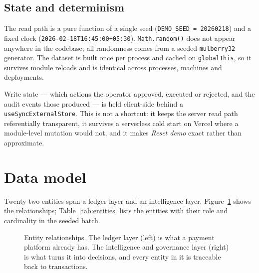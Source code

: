 \documentclass[10pt,twocolumn,a4paper]{article}
\newcommand{\code}[1]{\texttt{\small #1}}
\begin{document}
\subsection{State and determinism}

The read path is a pure function of a single seed (\code{DEMO\_SEED =
20260218}) and a fixed clock (\code{2026-02-18T16:45:00+05:30}).
\code{Math.random()} does not appear anywhere in the codebase; all randomness
comes from a seeded \code{mulberry32} generator. The dataset is built once per
process and cached on \code{globalThis}, so it survives module reloads and is
identical across processes, machines and deployments.

Write state --- which actions the operator approved, executed or rejected, and
the audit events those produced --- is held client-side behind a
\code{useSyncExternalStore}. This is not a shortcut: it keeps the server read
path referentially transparent, it survives a serverless cold start on Vercel
where a module-level mutation would not, and it makes \emph{Reset demo} exact
rather than approximate.

\section{Data model}
\label{sec:data}

Twenty-two entities span a ledger layer and an intelligence layer.
Figure~\ref{fig:er} shows the relationships; Table~\ref{tab:entities} lists the
entities with their role and cardinality in the seeded batch.

\begin{figure}[t]
  \centering
  \resizebox{0.98\textwidth}{!}{}
  \caption{Entity relationships. The ledger layer (left) is what a payment
  platform already has. The intelligence and governance layer (right) is what
  turns it into decisions, and every entity in it is traceable back to
  transactions.}
  \label{fig:er}
\end{figure}
\end{document}
